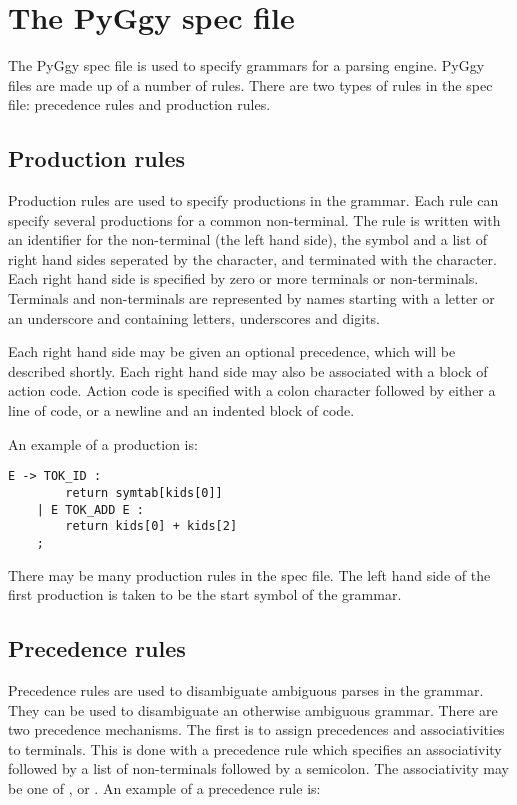 \chapter{The PyGgy spec file}

The PyGgy spec file is used to specify grammars for a parsing engine.
PyGgy files are made up of a number of rules.  There are two types
of rules in the spec file: precedence rules and production rules.

\section{Production rules}
Production rules are used to specify productions in the grammar.
Each rule can specify several productions for a common non-terminal.
The rule is written with an identifier for the non-terminal (the
left hand side), the symbol \code{->} and a list of right hand sides seperated
by the \code{|} character, and terminated with the \code{;} character.  
Each right 
hand side is specified by zero or more terminals or non-terminals.
Terminals and non-terminals are represented by names starting with
a letter or an underscore and containing letters, underscores and
digits.  

Each right hand side may be given an optional precedence, which will
be described shortly.  Each right hand side may also be associated
with a block of action code.  Action code is specified with a colon
character followed by either a line of code, or a newline and an
indented block of code.

An example of a production is:
\begin{verbatim}
E -> TOK_ID :
        return symtab[kids[0]]
    | E TOK_ADD E :
        return kids[0] + kids[2]
    ;
\end{verbatim}


There may be many production rules in the
spec file.  The left hand side of the first production is taken
to be the start symbol of the grammar.

\section{Precedence rules}
Precedence rules are used to disambiguate ambiguous parses in the
grammar.  They can be used to disambiguate an otherwise ambiguous
grammar.  There are two precedence mechanisms.  The first is to assign
precedences and associativities to terminals.  This is done with
a precedence rule which specifies an associativity
followed by a list of non-terminals followed by a semicolon.
The associativity may be one of , 
or .  An example of a precedence rule is:

